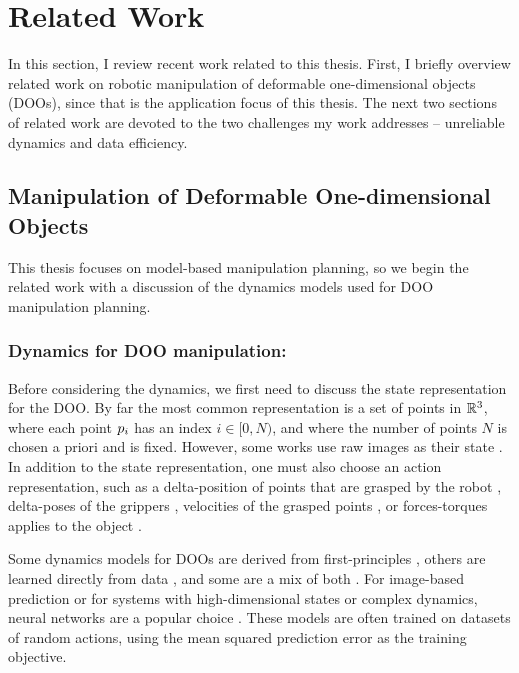 \section{Related Work} \label{Intro:sec:related_work}

In this section, I review recent work related to this thesis. First, I briefly overview related work on robotic manipulation of deformable one-dimensional objects (DOOs), since that is the application focus of this thesis. The next two sections of related work are devoted to the two challenges my work addresses -- unreliable dynamics and data efficiency.

\subsection{Manipulation of Deformable One-dimensional Objects}

This thesis focuses on model-based manipulation planning, so we begin the related work with a discussion of the dynamics models used for DOO manipulation planning.

\subsubsection{Dynamics for DOO manipulation:}

Before considering the dynamics, we first need to discuss the state representation for the DOO. By far the most common representation is a set of points in $\mathbb{R}^3$, where each point $p_i$ has an index $i\in[0,N)$, and where the number of points $N$ is chosen a priori and is fixed. However, some works use raw images as their state \cite{Finn2017,Nagabandi2018,Wang2019,nagabandi19learning,Finn2017,HoqueCloth2020}. In addition to the state representation, one must also choose an action representation, such as a delta-position of points that are grasped by the robot \cite{ZixuanCloth21,lin2020softgym,HoqueCloth2020}, delta-poses of the grippers \cite{CJM}, velocities of the grasped points \cite{Propnet}, or forces-torques applies to the object \cite{Rods2008,Lamiraux2001}.

Some dynamics models for DOOs are derived from first-principles \cite{Terzopoulos87,Lamiraux2001,Rods2008}, others are learned directly from data \cite{Finn2017,CFM,OfflineOnline22}, and some are a mix of both \cite{Propnet,li2022graph,holl2020learning}. For image-based prediction or for systems with high-dimensional states or complex dynamics, neural networks are a popular choice \cite{Goldberg1993,Finn2017,Nagabandi2018,Ichter2019,HoqueCloth2020}. These models are often trained on datasets of random actions, using the mean squared prediction error as the training objective.

